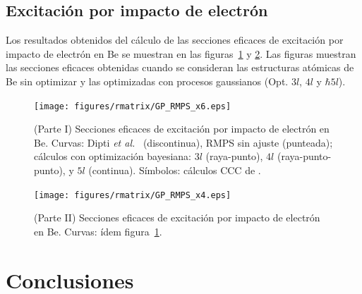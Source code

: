 \subsection{Excitación por impacto de electrón}

Los resultados obtenidos del cálculo de las secciones eficaces de 
excitación por impacto de electrón en Be se muestran en las 
figuras~\ref{fig:crossBe-partI} y \ref{fig:crossBe-partII}. Las figuras 
muestran las secciones eficaces obtenidas cuando se consideran las 
estructuras atómicas de Be sin optimizar y las optimizadas con procesos
gaussianos (Opt. $3l$, $4l$ y $\hbar{5l}$). 

\begin{figure}[H]
\centering
\texttt{[image: figures/rmatrix/GP\_RMPS\_x6.eps]} 
\caption[Secciones eficaces de excitación de Be (Parte I).]
{(Parte I) Secciones eficaces de excitación por impacto de electrón en Be. 
Curvas: Dipti \textit{et al.}~\cite{Dipti:19} (discontinua), RMPS sin 
ajuste (punteada); cálculos con optimización bayesiana: 
$3l$ (raya-punto), 
$4l$ (raya-punto-punto), y
$5l$ (continua). 
Símbolos: cálculos CCC de \cite{Fursa:97}.}
\label{fig:crossBe-partI}
\end{figure}


\begin{figure}[H]
\centering
\texttt{[image: figures/rmatrix/GP\_RMPS\_x4.eps]} 
\caption[Secciones eficaces de excitación de Be (Parte II).]
{(Parte II) Secciones eficaces de excitación por impacto de electrón en Be.
Curvas: ídem figura~\ref{fig:crossBe-partI}.}
\label{fig:crossBe-partII}
\end{figure}

\newpage
\section{Conclusiones}
